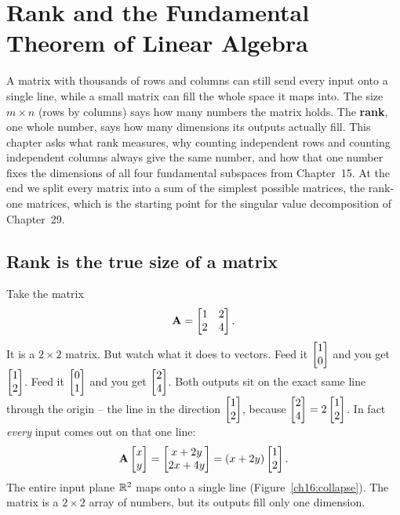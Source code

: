 \chapter{Rank and the Fundamental Theorem of Linear Algebra}

A matrix with thousands of rows and columns can still send every input onto a
single line, while a small matrix can fill the whole space it maps into. The
size $m \times n$ (rows by columns) says how many numbers the matrix holds. The
\textbf{rank}, one whole number, says how many dimensions its outputs actually
fill. This chapter asks what rank measures, why counting independent rows and
counting independent columns always give the same number, and how that one
number fixes the dimensions of all four fundamental subspaces from
Chapter~15. At the end we split every matrix into a sum of the simplest
possible matrices, the rank-one matrices, which is the starting point for the
singular value decomposition of Chapter~29.

\chapterline

\section{Rank is the true size of a matrix}

Take the matrix
\[
  \mathbf{A} = \begin{bmatrix} 1 & 2 \\ 2 & 4 \end{bmatrix}.
\]
It is a $2\times 2$ matrix. But watch what it does to vectors. Feed it $\begin{bmatrix}1 \\ 0\end{bmatrix}$ and you
get $\begin{bmatrix}1 \\ 2\end{bmatrix}$. Feed it $\begin{bmatrix}0 \\ 1\end{bmatrix}$ and you get $\begin{bmatrix}2 \\ 4\end{bmatrix}$.
Both outputs sit on the exact same line through the origin -- the line in the direction
$\begin{bmatrix}1 \\ 2\end{bmatrix}$, because $\begin{bmatrix}2 \\ 4\end{bmatrix} = 2\begin{bmatrix}1 \\ 2\end{bmatrix}$. In fact
\emph{every} input comes out on that one line:
\[
  \mathbf{A}\begin{bmatrix}x \\ y\end{bmatrix} = \begin{bmatrix}x + 2y \\ 2x + 4y\end{bmatrix} = (x + 2y)\begin{bmatrix}1 \\ 2\end{bmatrix}.
\]
The entire input plane $\mathbb{R}^2$ maps onto a single line
(Figure~\ref{ch16:collapse}). The matrix is a $2 \times 2$ array of numbers,
but its outputs fill only one dimension.

